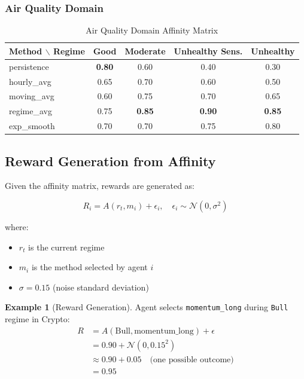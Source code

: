 \documentclass[11pt,a4paper]{article}
\theoremstyle{definition}
\newtheorem{example}{Example}[section]
\theoremstyle{plain}
\newcommand{\N}{\mathcal{N}}
\begin{document}
\subsubsection{Air Quality Domain}

\begin{table}[h]
\centering
\caption{Air Quality Domain Affinity Matrix}
\begin{tabular}{l|cccc}
\toprule
Method $\backslash$ Regime & Good & Moderate & Unhealthy Sens. & Unhealthy \\
\midrule
persistence & \textbf{0.80} & 0.60 & 0.40 & 0.30 \\
hourly\_avg & 0.65 & 0.70 & 0.60 & 0.50 \\
moving\_avg & 0.60 & 0.75 & 0.70 & 0.65 \\
regime\_avg & 0.75 & \textbf{0.85} & \textbf{0.90} & \textbf{0.85} \\
exp\_smooth & 0.70 & 0.70 & 0.75 & 0.80 \\
\bottomrule
\end{tabular}
\end{table}

\subsection{Reward Generation from Affinity}

Given the affinity matrix, rewards are generated as:

\begin{equation}
R_i = A(r_t, m_i) + \epsilon_i, \quad \epsilon_i \sim \N(0, \sigma^2)
\end{equation}

where:
\begin{itemize}
    \item $r_t$ is the current regime
    \item $m_i$ is the method selected by agent $i$
    \item $\sigma = 0.15$ (noise standard deviation)
\end{itemize}

\begin{example}[Reward Generation]
Agent selects \texttt{momentum\_long} during \texttt{Bull} regime in Crypto:
\begin{align}
R &= A(\text{Bull}, \text{momentum\_long}) + \epsilon \\
&= 0.90 + \N(0, 0.15^2) \\
&\approx 0.90 + 0.05 \quad \text{(one possible outcome)} \\
&= 0.95
\end{align}
\end{example}
\end{document}
